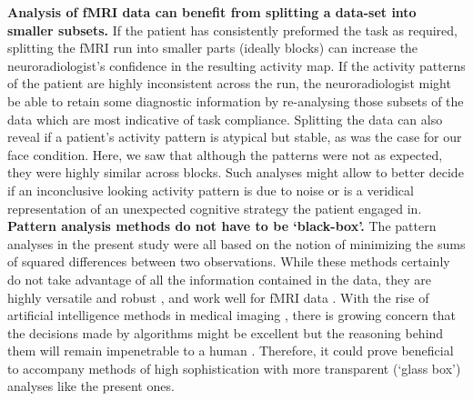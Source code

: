 \documentclass[fleqn,10pt]{SelfArx} %
\begin{document}
\textbf{Analysis of fMRI data can benefit from splitting a data-set into smaller subsets.} If the patient has consistently preformed the task as required, splitting the fMRI run into smaller parts (ideally blocks) can increase the neuroradiologist's confidence in the resulting activity map. If the activity patterns of the patient are highly inconsistent across the run, the neuroradiologist might be able to retain some diagnostic information by re-analysing those subsets of the data which are most indicative of task compliance. Splitting the data can also reveal if a patient's activity pattern is atypical but stable, as was the case for our face condition. Here, we saw that although the patterns were not as expected, they were highly similar across blocks. Such analyses might allow to better decide if an inconclusive looking activity pattern is due to noise or is a veridical representation of an unexpected cognitive strategy the patient engaged in. \\
\textbf{Pattern analysis methods do not have to be ‘black-box’.} The pattern analyses in the present study were all based on the notion of minimizing the sums of squared differences between two observations. While these methods certainly do not take advantage of all the information contained in the data, they are highly versatile and robust \citep{Hilborn_1997}, and work well for fMRI data \citep{Haxby_2001}. With the rise of artificial intelligence methods in medical imaging \citep{Esteva_2017}, there is growing concern that the decisions made by algorithms might be excellent but the reasoning behind them will remain impenetrable to a human \citep{Castelvecchi_2016}. Therefore, it could prove beneficial to accompany methods of high sophistication with more transparent (‘glass box’) analyses like the present ones. \\
\end{document}
